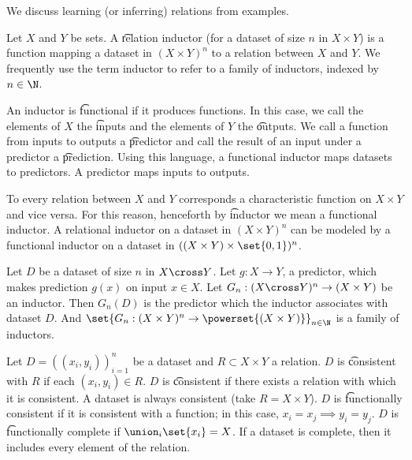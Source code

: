 

We discuss learning (or inferring) relations from examples.


Let $X$ and $Y$ be sets.
A \t{relation inductor} (for a dataset of size $n$ in $X \times Y$) is a function mapping a dataset in $(X \times Y)^n$ to a relation between $X$ and $Y$.
We frequently use the term inductor to refer to a family of inductors, indexed by $n \in \N$.

An inductor is \t{functional} if it produces functions.
In this case, we call the elements of $X$ the \t{inputs} and the elements of $Y$ the \t{outputs}.
We call a function from inputs to outputs a \t{predictor}    and call the result of an input under a predictor a \t{prediction}.
Using this language, a functional inductor maps datasets to predictors.
A predictor maps inputs to outputs.

To every relation between $X$ and $Y$ corresponds a characteristic function on $X \times Y$ and vice versa.
For this reason, henceforth by \t{inductor} we mean a functional inductor.
A relational inductor on a dataset in $(X \times Y)^n$ can be modeled by a functional inductor on a dataset in $((X \times Y) \times \set{0, 1})^n$.


Let $D$ be a dataset of size $n$ in $X \cross Y$.
Let $g: X \to Y$, a predictor, which makes prediction $g(x)$ on input $x \in X$.
Let $G_n: (X \cross Y)^n \to (X \times Y)$ be an inductor.
Then $G_n(D)$ is the predictor which the inductor associates with dataset $D$.
And $\set{G_n: (X \times Y)^n \to \powerset{(X \times Y)}}_{n \in \N}$ is a family of inductors.


Let $D = ((x_i, y_i))_{i =1}^{n}$ be a dataset and $R \subset X \times Y$ a relation.
$D$ is \t{consistent with $R$} if each $(x_i, y_i) \in R$.
$D$ is \t{consistent} if there exists a relation with which it is consistent.
A dataset is always consistent (take $R = X \times Y$).
$D$ is \t{functionally consistent} if it is consistent with a function; in this case, $x_i = x_j \implies y_i = y_j$.
$D$ is \t{functionally complete} if $\union_i\set{x_i} = X$.
If a dataset is complete, then it includes every element of the relation.


